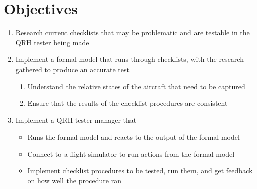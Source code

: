 \documentclass[../dissertation.tex]{subfiles}
\begin{document}
\section{Objectives}
\begin{enumerate}
  \item Research current checklists that may be problematic and are testable
    in the QRH tester being made
  \item Implement a formal model that runs through checklists, with the
    research gathered to produce an accurate test
    \begin{enumerate}
      \item Understand the relative states of the aircraft that need to be captured
      \item Ensure that the results of the checklist procedures are consistent
    \end{enumerate}
  \item Implement a QRH tester manager that
    \begin{itemize}
      \item Runs the formal model and reacts to the output of the formal model
      \item Connect to a flight simulator to run actions from the formal model
      \item Implement checklist procedures to be tested, run them, and get
        feedback on how well the procedure ran
    \end{itemize}
\end{enumerate}
\end{document}
